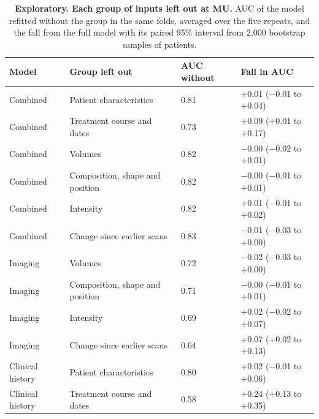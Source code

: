 \documentclass[11pt,a4paper]{article}
\begin{document}
\begin{table}[!htbp]
\renewcommand{\thetable}{S10}\renewcommand{\theHtable}{S10}
\centering
\caption{\textbf{Exploratory. Each group of inputs left out at MU.} AUC of the model refitted without the group in the
same folds, averaged over the five repeats, and the fall from the full model with its paired 95\% interval from 2,000
bootstrap samples of patients.}
\label{tab:S26a}
\footnotesize
\begin{tabularx}{\linewidth}{@{}R{2.4cm}LR{2.2cm}R{3.4cm}@{}}
\toprule
Model & Group left out & AUC without & Fall in AUC \\
\midrule
Combined & Patient characteristics & 0.81 & $+$0.01 ($-$0.01 to $+$0.04) \\
Combined & Treatment course and dates & 0.73 & $+$0.09 ($+$0.01 to $+$0.17) \\
Combined & Volumes & 0.82 & $-$0.00 ($-$0.02 to $+$0.01) \\
Combined & Composition, shape and position & 0.82 & $-$0.00 ($-$0.01 to $+$0.01) \\
Combined & Intensity & 0.82 & $+$0.01 ($-$0.01 to $+$0.02) \\
Combined & Change since earlier scans & 0.83 & $-$0.01 ($-$0.03 to $+$0.00) \\
\addlinespace
Imaging & Volumes & 0.72 & $-$0.02 ($-$0.03 to $+$0.00) \\
Imaging & Composition, shape and position & 0.71 & $-$0.00 ($-$0.01 to $+$0.01) \\
Imaging & Intensity & 0.69 & $+$0.02 ($-$0.02 to $+$0.07) \\
Imaging & Change since earlier scans & 0.64 & $+$0.07 ($+$0.02 to $+$0.13) \\
\addlinespace
Clinical history & Patient characteristics & 0.80 & $+$0.02 ($-$0.01 to $+$0.06) \\
Clinical history & Treatment course and dates & 0.58 & $+$0.24 ($+$0.13 to $+$0.35) \\
\bottomrule
\end{tabularx}
\end{table}
\end{document}
